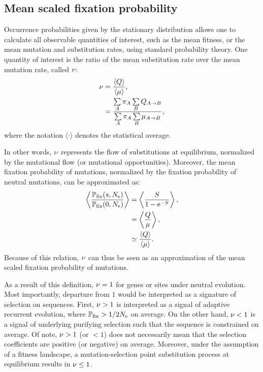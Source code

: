 \subsection{Mean scaled fixation probability}
\label{subsec:mean-scaled-fixation-probability}

Occurrence probabilities given by the stationary distribution allows one to calculate all observable quantities of interest, such as the mean fitness, or the mean mutation and substitution rates, using standard probability theory.
One quantity of interest is the ratio of the mean substitution rate over the mean mutation rate, called $ \nu $:
\begin{align}
    \nu & = \dfrac{ \langle Q \rangle }{\langle \mu \rangle},
    \label{eq:relative-sub-rate} \\
    & = \dfrac{ \sum\limits_{A} \pi_{A} \sum\limits_{B} Q_{A \to B}}{\sum\limits_{A} \pi_{A}  \sum\limits_{B} \mu_{A \to B}},
\end{align}
where the notation $\langle \cdot \rangle$ denotes the statistical average.

In other words, $ \nu $ represents the flow of substitutions at equilibrium, normalized by the mutational flow (or mutational opportunities).
Moreover, the mean fixation probability of mutations, normalized by the fixation probability of neutral mutations, can be approximated as:
\begin{align}
    \left\langle  \dfrac{ \mathbb{P}_{\text{fix}} (s, N_{\text{e}} ) }{\mathbb{P}_{\text{fix}} (0, N_{\text{e}} )}  \right\rangle & = \left\langle  \dfrac{ S }{1 - \text{e}^{- S}} \right\rangle, \\
    & = \left\langle \dfrac{ Q }{\mu} \right\rangle, \\
    & \simeq \dfrac{ \langle Q \rangle }{\langle \mu \rangle}.
\end{align}
Because of this relation, $\nu$ can thus be seen as an approximation of the mean scaled fixation probability of mutations.

As a result of this definition, $\nu=1$ for genes or sites under neutral evolution.
Most importantly, departure from $1$ would be interpreted as a signature of selection on sequences.
First, $\nu>1$ is interpreted as a signal of adaptive recurrent evolution, where $\mathbb{P}_{\text{fix}} > 1/2 N_{\text{e}}$ on average.
On the other hand, $\nu<1$ is a signal of underlying purifying selection such that the sequence is constrained on average.
Of note, $ \nu > 1$ (or $ < 1$) does not necessarily mean that the selection coefficients are positive (or negative) on average.
Moreover, under the assumption of a  fitness landscape, a mutation-selection point substitution process at equilibrium results in $\nu \leq 1$.

